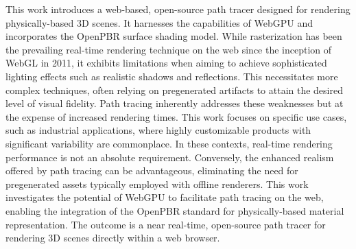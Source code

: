 
This work introduces a web-based, open-source path tracer designed for rendering physically-based 3D scenes. It harnesses the capabilities of WebGPU and incorporates the OpenPBR surface shading model. While rasterization has been the prevailing real-time rendering technique on the web since the inception of WebGL in 2011, it exhibits limitations when aiming to achieve sophisticated lighting effects such as realistic shadows and reflections. This necessitates more complex techniques, often relying on pregenerated artifacts to attain the desired level of visual fidelity. Path tracing inherently addresses these weaknesses but at the expense of increased rendering times. This work focuses on specific use cases, such as industrial applications, where highly customizable products with significant variability are commonplace. In these contexts, real-time rendering performance is not an absolute requirement. Conversely, the enhanced realism offered by path tracing can be advantageous, eliminating the need for pregenerated assets typically employed with offline renderers. This work investigates the potential of WebGPU to facilitate path tracing on the web, enabling the integration of the OpenPBR standard for physically-based material representation. The outcome is a near real-time, open-source path tracer for rendering 3D scenes directly within a web browser.
